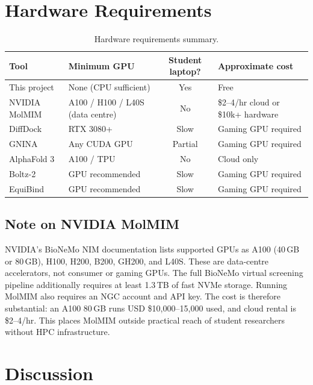 \documentclass[11pt,a4paper]{article}
\begin{document}
\section{Hardware Requirements}

\begin{table}[h]
\centering
\small
\renewcommand{\arraystretch}{1.3}
\begin{tabularx}{\textwidth}{p{3cm} p{4.5cm} c X}
\toprule
\textbf{Tool} & \textbf{Minimum GPU} & \textbf{Student laptop?} & \textbf{Approximate cost}\\
\midrule
This project    & None (CPU sufficient)            & Yes        & Free \\
NVIDIA MolMIM   & A100 / H100 / L40S (data centre) & No         & \$2--4/hr cloud or \$10k+ hardware \\
DiffDock        & RTX 3080+                        & Slow       & Gaming GPU required \\
GNINA           & Any CUDA GPU                     & Partial    & Gaming GPU required \\
AlphaFold 3     & A100 / TPU                       & No         & Cloud only \\
Boltz-2         & GPU recommended                  & Slow       & Gaming GPU required \\
EquiBind        & GPU recommended                  & Slow       & Gaming GPU required \\
\bottomrule
\end{tabularx}
\caption{Hardware requirements summary.}
\end{table}

\subsection*{Note on NVIDIA MolMIM}

NVIDIA's BioNeMo NIM documentation lists supported GPUs as A100 (40\,GB
or 80\,GB), H100, H200, B200, GH200, and L40S. These are data-centre
accelerators, not consumer or gaming GPUs. The full BioNeMo virtual
screening pipeline additionally requires at least 1.3\,TB of fast NVMe
storage. Running MolMIM also requires an NGC account and API key. The
cost is therefore substantial: an A100 80\,GB runs USD \$10{,}000--15{,}000
used, and cloud rental is \$2--4/hr. This places MolMIM outside practical
reach of student researchers without HPC infrastructure.

\section{Discussion}
\end{document}
